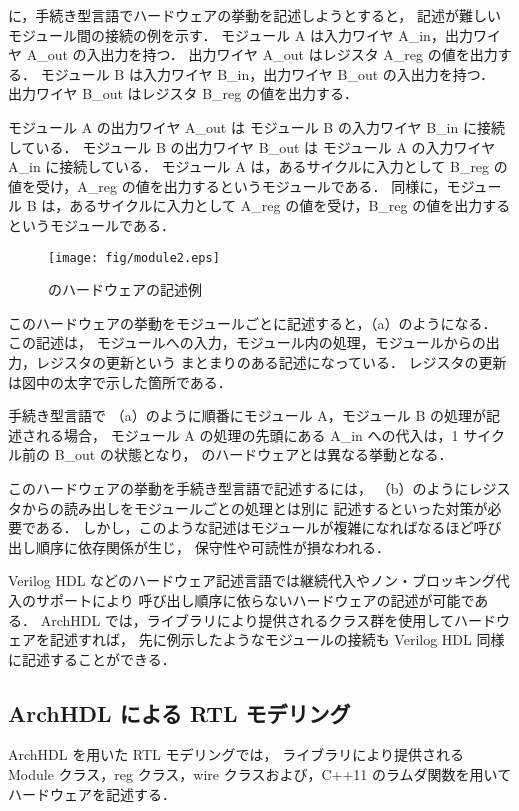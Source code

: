 \documentclass[submit,techreq,noauthor]{ipsj}
\begin{document}
 に，手続き型言語でハードウェアの挙動を記述しようとすると，
記述が難しいモジュール間の接続の例を示す．
モジュール A は入力ワイヤ A\_in，出力ワイヤ A\_out の入出力を持つ．
出力ワイヤ A\_out はレジスタ A\_reg の値を出力する．
モジュール B は入力ワイヤ B\_in，出力ワイヤ B\_out の入出力を持つ．
出力ワイヤ B\_out はレジスタ B\_reg の値を出力する．

モジュール A の出力ワイヤ A\_out は モジュール B の入力ワイヤ B\_in に接続している．
モジュール B の出力ワイヤ B\_out は モジュール A の入力ワイヤ A\_in に接続している．
モジュール A は，あるサイクルに入力として B\_reg の値を受け，A\_reg の値を出力するというモジュールである．
同様に，モジュール B は，あるサイクルに入力として A\_reg の値を受け，B\_reg の値を出力するというモジュールである．

\begin{figure}[t]
 \begin{center}
  \texttt{[image: fig/module2.eps]}
  \caption{のハードウェアの記述例}
  \label{fig:module2}
 \end{center}
\end{figure}

このハードウェアの挙動をモジュールごとに記述すると，（a）のようになる．
この記述は，
モジュールへの入力，モジュール内の処理，モジュールからの出力，レジスタの更新という
まとまりのある記述になっている．
レジスタの更新は図中の太字で示した箇所である．

手続き型言語で
（a）のように順番にモジュール A，モジュール B の処理が記述される場合，
モジュール A の処理の先頭にある A\_in への代入は，1 サイクル前の B\_out の状態となり，
のハードウェアとは異なる挙動となる．

このハードウェアの挙動を手続き型言語で記述するには，
（b）のようにレジスタからの読み出しをモジュールごとの処理とは別に
記述するといった対策が必要である．
しかし，このような記述はモジュールが複雑になればなるほど呼び出し順序に依存関係が生じ，
保守性や可読性が損なわれる．

Verilog HDL などのハードウェア記述言語では継続代入やノン・ブロッキング代入のサポートにより
呼び出し順序に依らないハードウェアの記述が可能である．
ArchHDL では，ライブラリにより提供されるクラス群を使用してハードウェアを記述すれば，
先に例示したようなモジュールの接続も Verilog HDL 同様に記述することができる．

\subsection{ArchHDL による RTL モデリング}
ArchHDL を用いた RTL モデリングでは，
ライブラリにより提供される Module クラス，reg クラス，wire クラスおよび，C++11 のラムダ関数を用いて
ハードウェアを記述する．
\end{document}
